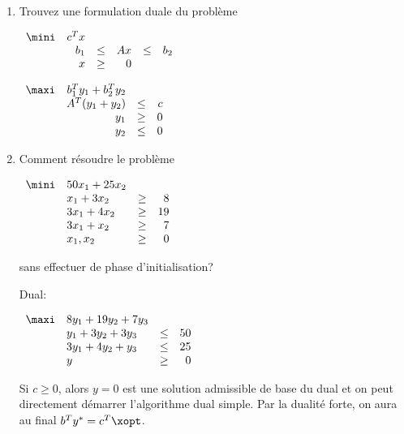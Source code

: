 \begin{enumerate}
\begin{solution}

    \end{solution}

  \item Trouvez une formulation duale du  problème

    $
    \begin{array}{lrcrcrcr}
      \mini & c^T x\\
      & b_1 & \leq & A x & \leq &  b_2\\
      & x   & \geq & 0
    \end{array}
    $

    \begin{solution}
      $
      \begin{array}{lrcrcrcr}
        \maxi & b_{1}^{T}y_{1} + b_{2}^{T}y_{2}\\
        & A^{T} (y_{1} + y_{2}) & \leq & c\\
        & y_1 & \geq & 0\\
        & y_2 & \leq & 0
      \end{array}
      $
    \end{solution}


  \item Comment résoudre le problème

    $
    \begin{array}{llcr}
      \mini & 50x_1+25x_2\\
      & x_1+3x_2 & \geq & 8\\
      & 3x_1+4x_2 & \geq & 19\\
      & 3x_1+x_2 & \geq & 7\\
      & x_1, x_2 & \geq & 0
    \end{array}
    $

    sans effectuer de phase d'initialisation?


    \begin{solution}
      Dual:

      $
      \begin{array}{llcr}
        \maxi & 8y_{1} + 19y_{2} + 7y_{3}\\
        & y_1 + 3y_2 + 3y_3 & \leq & 50\\
        & 3y_1 + 4y_2 + y_3 & \leq & 25\\
        & y & \geq & 0
      \end{array}
      $

      Si $c \geq 0$, alors $y=0$ est une solution admissible de base du dual et on peut directement démarrer l'algorithme dual simple. Par la dualité forte, on aura au final $b^{T}y^{*} = c^{T}\xopt$.
    \end{solution}


\end{enumerate}
